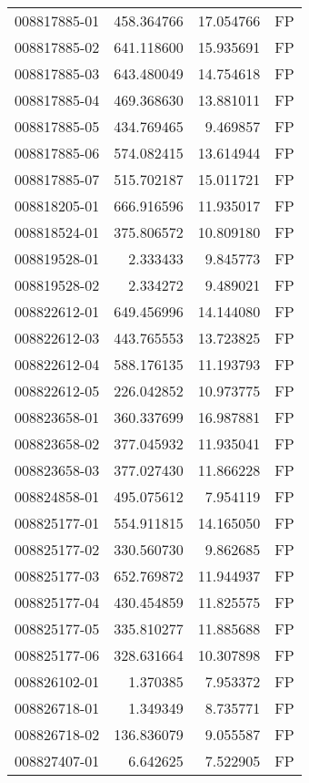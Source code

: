 \begin{tabular}{lrrl}
008817885-01 &  458.364766 &    17.054766 &   FP \\
008817885-02 &  641.118600 &    15.935691 &   FP \\
008817885-03 &  643.480049 &    14.754618 &   FP \\
008817885-04 &  469.368630 &    13.881011 &   FP \\
008817885-05 &  434.769465 &     9.469857 &   FP \\
008817885-06 &  574.082415 &    13.614944 &   FP \\
008817885-07 &  515.702187 &    15.011721 &   FP \\
008818205-01 &  666.916596 &    11.935017 &   FP \\
008818524-01 &  375.806572 &    10.809180 &   FP \\
008819528-01 &    2.333433 &     9.845773 &   FP \\
008819528-02 &    2.334272 &     9.489021 &   FP \\
008822612-01 &  649.456996 &    14.144080 &   FP \\
008822612-03 &  443.765553 &    13.723825 &   FP \\
008822612-04 &  588.176135 &    11.193793 &   FP \\
008822612-05 &  226.042852 &    10.973775 &   FP \\
008823658-01 &  360.337699 &    16.987881 &   FP \\
008823658-02 &  377.045932 &    11.935041 &   FP \\
008823658-03 &  377.027430 &    11.866228 &   FP \\
008824858-01 &  495.075612 &     7.954119 &   FP \\
008825177-01 &  554.911815 &    14.165050 &   FP \\
008825177-02 &  330.560730 &     9.862685 &   FP \\
008825177-03 &  652.769872 &    11.944937 &   FP \\
008825177-04 &  430.454859 &    11.825575 &   FP \\
008825177-05 &  335.810277 &    11.885688 &   FP \\
008825177-06 &  328.631664 &    10.307898 &   FP \\
008826102-01 &    1.370385 &     7.953372 &   FP \\
008826718-01 &    1.349349 &     8.735771 &   FP \\
008826718-02 &  136.836079 &     9.055587 &   FP \\
008827407-01 &    6.642625 &     7.522905 &   FP \\

\end{tabular}
